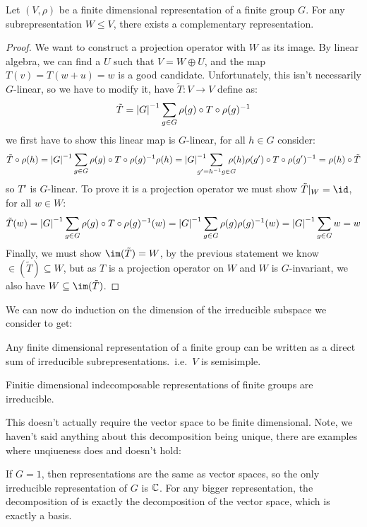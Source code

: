 \documentclass{article}
\begin{document}
\begin{theorem}[Maschke]
    Let $(V,\rho)$ be a finite dimensional representation of a finite group $G$. For any subrepresentation $W\leq V$, there exists a complementary representation.
    \begin{proof}
        We want to construct a projection operator with $W$ as its image. By linear algebra, we can find a $U$ such that $V=W\oplus U$, and the map $T(v)=T(w+u)=w$ is a good candidate. Unfortunately, this isn't necessarily $G$-linear, so we have to modify it, have $\tilde{T}:V\rightarrow V$ define as: \[
        \tilde{T} = \left| G \right|^{-1}\sum_{g\in G}\rho(g)\circ T\circ\rho(g)^{-1}
        \] we first have to show this linear map is $G$-linear, for all $h\in G$ consider: \[
        \tilde{T}\circ\rho(h) = \abs{G}^{-1}\sum_{g\in G}\rho(g)\circ T\circ\rho(g)^{-1} \rho(h) = \abs{G}^{-1}\mkern-22mu\sum_{g'=h^{-1}g\in G}\mkern-18mu\rho(h)\rho(g')\circ T\circ\rho(g')^{-1} = \rho(h)\circ\tilde{T}
        \] so $T'$ is $G$-linear. To prove it is a projection operator we must show $\tilde{T}\vert_W=\id$, for all $w\in W$: \[
        \tilde{T}(w) = \left| G \right|^{-1}\sum_{g\in G}\rho(g)\circ T\circ\rho(g)^{-1}(w) = \left| G \right|^{-1}\sum_{g\in G}\rho(g)\rho(g)^{-1}(w) = \left| G \right|^{-1}\sum_{g\in G}w = w
        \] Finally, we must show $\im(\tilde{T})=W$, by the previous statement we know $\in(\tilde{T})\subseteq W$, but as $T$ is a projection operator on $W$ and $W$ is $G$-invariant, we also have $W\subseteq \im(\tilde{T})$.
    \end{proof}
\end{theorem}

We can now do induction on the dimension of the irreducible subspace we consider to get:

\begin{corollary}
    Any finite dimensional representation of a finite group can be written as a direct sum of irreducible subrepresentations.~i.e.~$V$ is semisimple.
\end{corollary}

\begin{corollary}
    Finitie dimensional indecomposable representations of finite groups are irreducible.
\end{corollary}

This doesn't actually require the vector space to be finite dimensional. Note, we haven't said anything about this decomposition being unique, there are examples where unqiueness does and doesn't hold:

If $G=1$, then  representations are the same as vector spaces, so the only irreducible representation of $G$ is $\mathbb{C}$. For any bigger representation, the decomposition of is exactly the decomposition of the vector space, which is exactly a basis.
\end{document}
